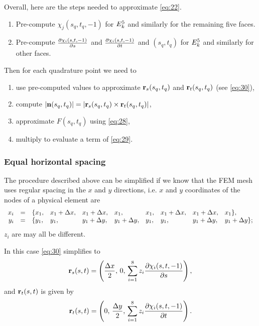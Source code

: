 \documentclass[11pt]{article}
\begin{document}
Overall, here are the steps needed to approximate \eqref{eq:22}.

\begin{enumerate}
\item Pre-compute $\chi_{j}(s_{q}, t_{q}, -1)$ for $E_{k}^{5}$ and similarly
for the remaining five faces.
\item Pre-compute $\frac{\partial \chi_{i}(s, t, -1)}{\partial s}$ and
$\frac{\partial \chi_{i}(s, t, -1)}{\partial t}$ and $(s_{q}, t_{q})$ for $E_{k}^{5}$ and similarly for
other faces.
\end{enumerate}

Then for each quadrature point we need to

\begin{enumerate}
\item use pre-computed values to approximate $\mathbf{r}_{s}(s_{q},t_{q})$ and
$\mathbf{r}_{t}(s_{q},t_{q})$ (see \eqref{eq:30}),
\item compute $|\mathbf{n}(s_{q}, t_{q})| = | \mathbf{r}_{s}(s_{q}, t_{q}) \times \mathbf{r}_{t}(s_{q}, t_{q}) |$,
\item approximate $F(s_{q}, t_{q})$ using \eqref{eq:28},
\item multiply to evaluate a term of \eqref{eq:29}.
\end{enumerate}

\subsubsection{Equal horizontal spacing}
\label{sec-4-1-1}

The procedure described above can be simplified if we know that the
FEM mesh uses regular spacing in the $x$ and $y$ directions, i.e.
$x$ and $y$ coordinates of the nodes of a physical element are
\begin{equation}
  \label{eq:31}
  \begin{array}{rcllllllll}
    x_{i} &=& \{ x_{1}, &x_{1} + \Delta x, &x_{1} + \Delta x, &x_{1}, &x_{1}, &x_{1} + \Delta x, &x_{1} + \Delta x, &x_{1} \},\\
    y_{i} &=& \{ y_{1}, &y_{1}, &y_{1} + \Delta y, &y_{1} + \Delta y, &y_{1}, &y_{1}, &y_{1} + \Delta y, &y_{1} + \Delta y \};\\
  \end{array}
\end{equation}
$z_{i}$ are may all be different.

In this case \eqref{eq:30} simplifies to
\begin{equation}
  \label{eq:32}
  \mathbf{r}_{s}(s,t) = \left(
    \frac{\Delta x}{2},\,
    0,\,
    \sum_{i=1}^{8} z_{i} \frac{\partial \chi_{i}(s, t, -1)}{\partial s} \right),
\end{equation}
and $\mathbf{r}_{t}(s,t)$ is given by
\begin{equation}
  \label{eq:33}
  \mathbf{r}_{t}(s,t) = \left(
    0,\,
    \frac{\Delta y}{2},\,
    \sum_{i=1}^{8} z_{i} \frac{\partial \chi_{i}(s, t, -1)}{\partial t} \right).
\end{equation}
\end{document}
